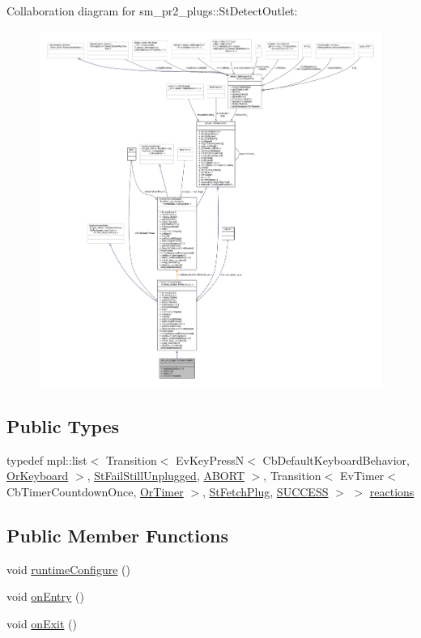 Collaboration diagram for sm\+\_\+pr2\+\_\+plugs\+:\+:St\+Detect\+Outlet\+:
\nopagebreak
\begin{figure}[H]
\begin{center}
\leavevmode
\includegraphics[width=350pt]{structsm__pr2__plugs_1_1StDetectOutlet__coll__graph}
\end{center}
\end{figure}
\subsection*{Public Types}
\begin{DoxyCompactItemize}
\item 
typedef mpl\+::list$<$ Transition$<$ Ev\+Key\+PressN$<$ Cb\+Default\+Keyboard\+Behavior, \hyperlink{classsm__pr2__plugs_1_1OrKeyboard}{Or\+Keyboard} $>$, \hyperlink{structsm__pr2__plugs_1_1StFailStillUnplugged}{St\+Fail\+Still\+Unplugged}, \hyperlink{classABORT}{A\+B\+O\+RT} $>$, Transition$<$ Ev\+Timer$<$ Cb\+Timer\+Countdown\+Once, \hyperlink{classsm__pr2__plugs_1_1OrTimer}{Or\+Timer} $>$, \hyperlink{structsm__pr2__plugs_1_1StFetchPlug}{St\+Fetch\+Plug}, \hyperlink{classSUCCESS}{S\+U\+C\+C\+E\+SS} $>$ $>$ \hyperlink{structsm__pr2__plugs_1_1StDetectOutlet_a5d2a06136d75847c4f23be956d5c157a}{reactions}
\end{DoxyCompactItemize}
\subsection*{Public Member Functions}
\begin{DoxyCompactItemize}
\item 
void \hyperlink{structsm__pr2__plugs_1_1StDetectOutlet_a9fbc44b452367aa843d37316eb6e64bc}{runtime\+Configure} ()
\item 
void \hyperlink{structsm__pr2__plugs_1_1StDetectOutlet_ae37fe56530b2a1b18afba3950f8ef29a}{on\+Entry} ()
\item 
void \hyperlink{structsm__pr2__plugs_1_1StDetectOutlet_af24c92abcf1033afd26f44dca7e09d3f}{on\+Exit} ()
\end{DoxyCompactItemize}
